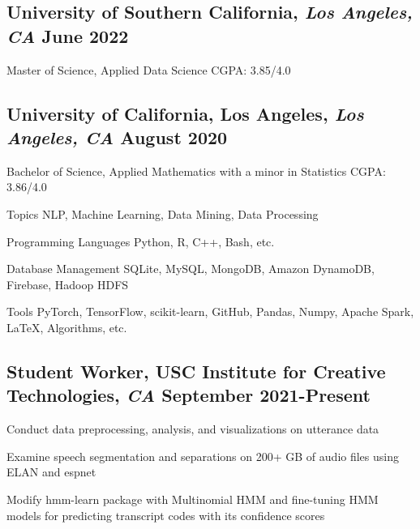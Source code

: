 \documentclass[11pt]{article}
\begin{document}
\subsection*{University of Southern California{\normalfont, \textit{Los Angeles, CA} \hfill June 2022}}
\noindent
Master of Science, Applied Data Science
\hfill
CGPA: 3.85/4.0


\subsection*{University of California, Los Angeles{\normalfont, \textit{Los Angeles, CA} \hfill August 2020}}
\noindent
Bachelor of Science, Applied Mathematics with a minor in Statistics
\hfill
CGPA: 3.86/4.0

\vspace{0.1in}

\vspace{0.05in}
\begin{compactdesc}
	\item[Topics] NLP, Machine Learning, Data Mining, Data Processing
    \item[Programming Languages] Python, R, C++, Bash, etc.
    \item[Database Management] SQLite, MySQL, MongoDB, Amazon DynamoDB, Firebase, Hadoop HDFS
    \item[Tools] PyTorch, TensorFlow, scikit-learn, GitHub, Pandas, Numpy, Apache Spark, \LaTeX,
    Algorithms, etc.
\end{compactdesc}

\vspace{0.1in}

\subsection*{Student Worker{\normalfont, USC Institute for Creative
            Technologies,
            \textit{CA} \hfill
            September 2021-Present}}
\begin{compactitem}
    \item Conduct data preprocessing, analysis, and visualizations on utterance data
    \item Examine speech segmentation and separations on 200+ GB of audio files using ELAN and espnet
    \item Modify hmm-learn package with Multinomial HMM and fine-tuning HMM models for predicting transcript codes with its confidence scores
\end{compactitem}
\end{document}
